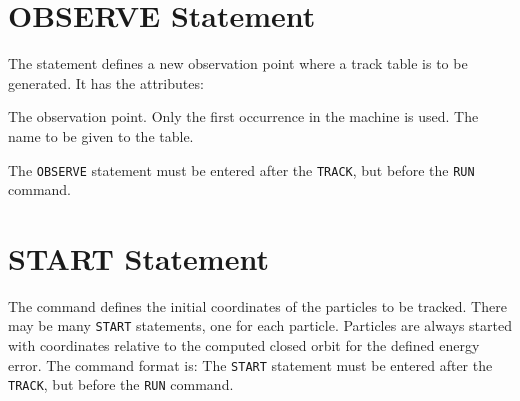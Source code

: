 \section{OBSERVE Statement}
\label{S-OBSERVE}
The statement
defines a new observation point where a track table is to be
generated.
It has the attributes:
\begin{mylist}
The observation point.
Only the first occurrence in the machine is used.
The name to be given to the table.
\end{mylist}
The {\tt OBSERVE} statement must be entered after the {\tt TRACK},
but before the {\tt RUN} command.

\section{START Statement}
\label{S-START}
The  command defines the initial coordinates of
the particles to be tracked.
There may be many {\tt START} statements, one for each particle.
Particles are always started with coordinates relative
to the computed closed orbit for the defined energy error.
The command format is:
The {\tt START} statement must be entered after the {\tt TRACK},
but before the {\tt RUN} command.

